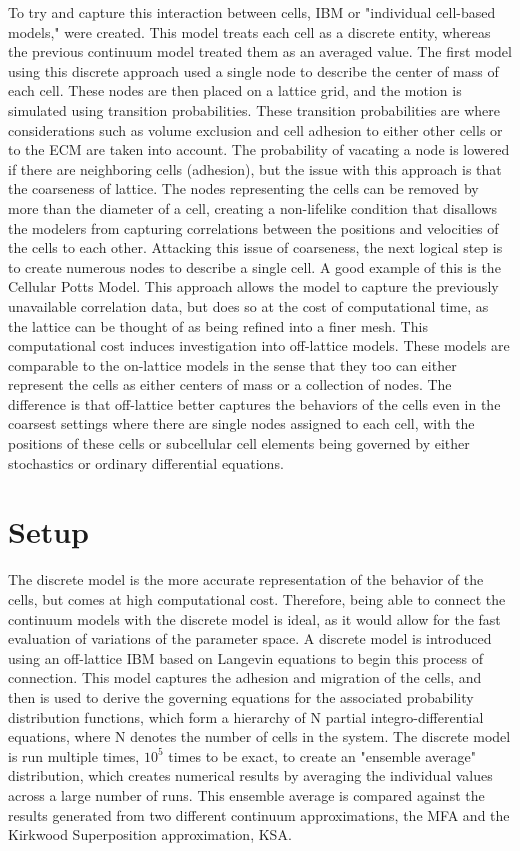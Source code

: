 \documentclass[12pt,letterpaper,cm]{article}
\renewcommand{\.}{\cdot}
\newcommand{\<}{\langle}
\renewcommand{\>}{\rangle}
\begin{document}
	To try and capture this interaction between cells, IBM or "individual cell-based models," were created.  This model treats each cell as a discrete entity, whereas the previous continuum model treated them as an averaged value.  The first model using this discrete approach used a single node to describe the center of mass of each cell.  These nodes are then placed on a lattice grid, and the motion is simulated using transition probabilities.  These transition probabilities are where considerations such as volume exclusion and cell adhesion to either other cells or to the ECM are taken into account.  The probability of vacating a node is lowered if there are neighboring cells (adhesion), but the issue with this approach is that the coarseness of lattice.  The nodes representing the cells can be removed by more than the diameter of a cell, creating a non-lifelike condition that disallows the modelers from capturing correlations between the positions and velocities of the cells to each other.  Attacking this issue of coarseness, the next logical step is to create numerous nodes to describe a single cell.  A good example of this is the Cellular Potts Model.  This approach allows the model to capture the previously unavailable correlation data, but does so at the cost of computational time, as the lattice can be thought of as being refined into a finer mesh.  This computational cost induces investigation into off-lattice models.  These models are comparable to the on-lattice models in the sense that they too can either represent the cells as either centers of mass or a collection of nodes.  The difference is that off-lattice better captures the behaviors of the cells even in the coarsest settings where there are single nodes assigned to each cell, with the positions of these cells or subcellular cell elements being governed by either stochastics or ordinary differential equations.
	\section{Setup}
	
	\indent 
	
	The discrete model is the more accurate representation of the behavior of the cells, but comes at high computational cost.  Therefore, being able to connect the continuum models with the discrete model is ideal, as it would allow for the fast evaluation of variations of the parameter space.  A discrete model is introduced using an off-lattice IBM based on Langevin equations to begin this process of connection.  This model captures the adhesion and migration of the cells, and then is used to derive the governing equations for the associated probability distribution functions, which form a hierarchy of N partial integro-differential equations, where N denotes the number of cells in the system.  The discrete model is run multiple times, $10^5$ times to be exact, to create an "ensemble average" distribution, which creates numerical results by averaging the individual values across a large number of runs.  This ensemble average is compared against the results generated from two different continuum approximations, the MFA and the Kirkwood Superposition approximation, KSA.
	
\end{document}
